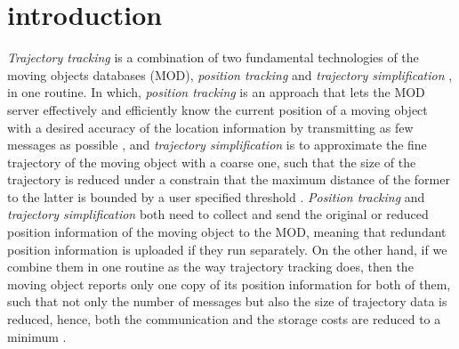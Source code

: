 

\section{introduction}
\label{sec-intro}


\textit{Trajectory tracking} \cite{Lange:Tracking} is a combination of  two fundamental technologies of the moving objects databases (MOD), \textit{position tracking} \cite{Wolfson:PositionTracking,Leonhardi:Comparison} and \textit{trajectory simplification} \cite{Lin:Cised,Zhang:Evaluation}, in one routine. 
In which, \textit{position tracking} is an approach that lets the MOD server effectively and efficiently know the current position of a moving object with a desired accuracy of the location information by transmitting as few messages as possible \cite{Leonhardi:Comparison}, and \textit{trajectory simplification} is to approximate the fine trajectory of the moving object with a coarse one, such that the size of the trajectory is reduced under a constrain that the maximum distance of the former to the latter is bounded by a user specified threshold \cite{Lin:Cised,Zhang:Evaluation}.
\textit{Position tracking} and \textit{trajectory simplification} both need to collect and send the original or reduced position information of the moving object to the MOD, meaning that redundant position information is uploaded if they run separately.
%
On the other hand, if we combine them in one routine as the way trajectory tracking does, then the moving object reports only one copy of its position information for both of them, such that not only the number of messages but also the size of trajectory data is reduced, hence, both the communication and the storage costs are reduced to a minimum \cite{Lange:Tracking}.

 

